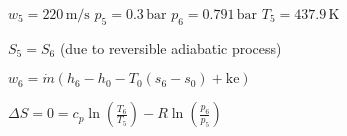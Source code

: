 \( w_5 = 220 \, \text{m/s} \)  
\( p_5 = 0.3 \, \text{bar} \)  
\( p_6 = 0.791 \, \text{bar} \)  
\( T_5 = 437.9 \, \text{K} \)  

\( S_5 = S_6 \) (due to reversible adiabatic process)  

\( w_6 = \dot{m} (h_6 - h_0 - T_0 (s_6 - s_0) + \text{ke}) \)  

\( \Delta S = 0 = c_p \ln \left( \frac{T_6}{T_5} \right) - R \ln \left( \frac{p_6}{p_5} \right) \)